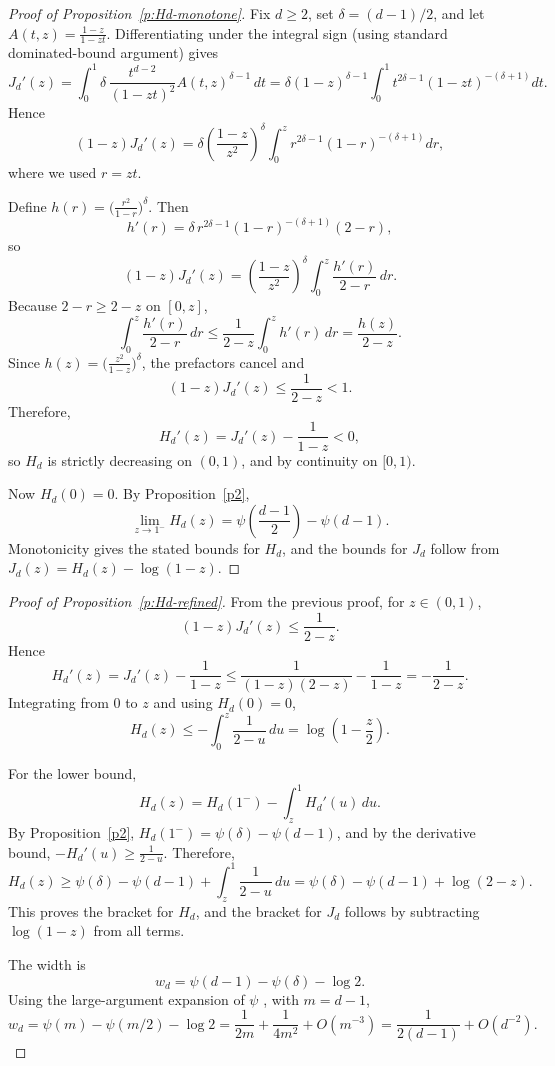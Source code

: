 \documentclass{article}
\begin{document}
\begin{proof}[Proof of Proposition~\ref{p:Hd-monotone}]
Fix \(d\ge 2\), set \(\delta=(d-1)/2\), and let
\(A(t,z)=\frac{1-z}{1-zt}\).
Differentiating under the integral sign (using standard dominated-bound argument) gives
\[
J_d'(z)=\int_0^1 \delta\,\frac{t^{d-2}}{(1-zt)^2}A(t,z)^{\delta-1}\,dt
=\delta(1-z)^{\delta-1}\int_0^1 t^{2\delta-1}(1-zt)^{-(\delta+1)}dt.
\]
Hence
\[
(1-z)J_d'(z)
=\delta\left(\frac{1-z}{z^2}\right)^\delta
\int_0^z r^{2\delta-1}(1-r)^{-(\delta+1)}dr,
\]
where we used \(r=zt\).

Define \(h(r)=\bigl(\frac{r^2}{1-r}\bigr)^\delta\). Then
\[
h'(r)=\delta\,r^{2\delta-1}(1-r)^{-(\delta+1)}(2-r),
\]
so
\[
(1-z)J_d'(z)=\left(\frac{1-z}{z^2}\right)^\delta\int_0^z\frac{h'(r)}{2-r}\,dr.
\]
Because \(2-r\ge 2-z\) on \([0,z]\),
\[
\int_0^z\frac{h'(r)}{2-r}\,dr
\le \frac{1}{2-z}\int_0^z h'(r)\,dr
=\frac{h(z)}{2-z}.
\]
Since \(h(z)=\bigl(\frac{z^2}{1-z}\bigr)^\delta\), the prefactors cancel and
\[
(1-z)J_d'(z)\le \frac{1}{2-z}<1.
\]
Therefore,
\[
H_d'(z)=J_d'(z)-\frac{1}{1-z}<0,
\]
so \(H_d\) is strictly decreasing on \((0,1)\), and by continuity on \([0,1)\).

Now \(H_d(0)=0\). By Proposition~\ref{p2},
\[
\lim_{z\to 1^-}H_d(z)=\psi\left(\frac{d-1}{2}\right)-\psi(d-1).
\]
Monotonicity gives the stated bounds for \(H_d\), and the bounds for \(J_d\) follow from
\(J_d(z)=H_d(z)-\log(1-z)\).
\end{proof}

\begin{proof}[Proof of Proposition~\ref{p:Hd-refined}]
From the previous proof, for \(z\in(0,1)\),
\[
(1-z)J_d'(z)\le \frac{1}{2-z}.
\]
Hence
\[
H_d'(z)=J_d'(z)-\frac{1}{1-z}
\le \frac{1}{(1-z)(2-z)}-\frac{1}{1-z}
=-\frac{1}{2-z}.
\]
Integrating from \(0\) to \(z\) and using \(H_d(0)=0\),
\[
H_d(z)\le -\int_0^z\frac{1}{2-u}\,du
=\log\left(1-\frac{z}{2}\right).
\]

For the lower bound,
\[
H_d(z)=H_d(1^-)-\int_z^1 H_d'(u)\,du.
\]
By Proposition~\ref{p2},
\(H_d(1^-)=\psi(\delta)-\psi(d-1)\), and by the derivative bound,
\(-H_d'(u)\ge\frac{1}{2-u}\). Therefore,
\[
H_d(z)
\ge \psi(\delta)-\psi(d-1)+\int_z^1\frac{1}{2-u}\,du
=\psi(\delta)-\psi(d-1)+\log(2-z).
\]
This proves the bracket for \(H_d\), and the bracket for \(J_d\) follows by
subtracting \(\log(1-z)\) from all terms.

The width is
\[
w_d=\psi(d-1)-\psi(\delta)-\log 2.
\]
Using the large-argument expansion of \(\psi\) \cite[5.11.2]{watson:DLMF}, with
\(m=d-1\),
\[
w_d=\psi(m)-\psi(m/2)-\log 2
=\frac{1}{2m}+\frac{1}{4m^2}+O(m^{-3})
=\frac{1}{2(d-1)}+O(d^{-2}).
\]
\end{proof}
\end{document}
